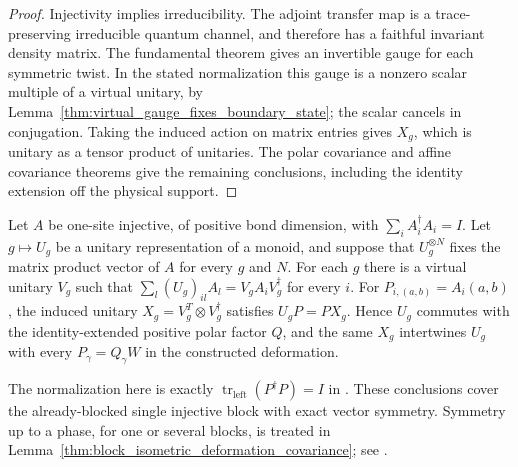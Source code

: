 \begin{proof}
    \leanok
    Injectivity implies irreducibility. The adjoint transfer map is a
    trace-preserving irreducible quantum channel, and therefore has a
    faithful invariant density matrix. The fundamental theorem gives
    an invertible gauge for each symmetric twist. In the stated
    normalization this gauge is a nonzero scalar multiple of a virtual
    unitary, by Lemma~\ref{thm:virtual_gauge_fixes_boundary_state}; the
    scalar cancels in conjugation. Taking the induced action on matrix
    entries gives $X_g$, which is unitary as a tensor product of
    unitaries. The polar covariance and affine covariance theorems give
    the remaining conclusions, including the identity extension off
    the physical support.
\end{proof}

\begin{lemma}
    \label{thm:injective_isometric_deformation_tp_covariance}
    \leanok
    Let $A$ be one-site injective, of positive bond dimension, with
    $\sum_iA_i^\dagger A_i=I$. Let $g\mapsto U_g$ be a unitary
    representation of a monoid, and suppose that $U_g^{\otimes N}$
    fixes the matrix product vector of $A$ for every $g$ and $N$.
    For each $g$ there is a virtual unitary $V_g$ such that
    $\sum_l(U_g)_{il}A_l=V_gA_iV_g^\dagger$ for every $i$.
    For $P_{i,(a,b)}=A_i(a,b)$, the induced unitary
    $X_g=V_g^T\otimes V_g^\dagger$ satisfies $U_gP=PX_g$.
    Hence $U_g$ commutes with the identity-extended positive polar
    factor $Q$, and the same $X_g$ intertwines $U_g$ with every
    $P_\gamma=Q_\gamma W$ in the constructed deformation.

    The normalization here is exactly
    $\operatorname{tr}_{\mathrm{left}}(P^\dagger P)=I$ in
    \cite[line~653]{Schuch2011Phases}. These conclusions cover the
    already-blocked single injective block with exact vector symmetry.
    Symmetry up to a phase, for one or several blocks, is treated in
    Lemma~\ref{thm:block_isometric_deformation_covariance}; see
    \cite{gap:spc11_isometric_symmetry_unitary_virtual}.
\end{lemma}

